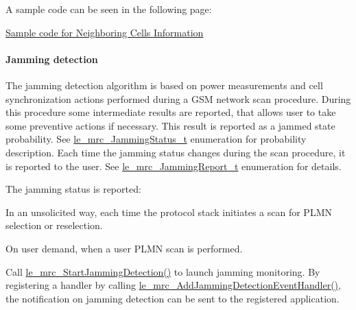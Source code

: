 A sample code can be seen in the following page\+:
\begin{DoxyItemize}
\item \hyperlink{c_mrcNeighborCells}{Sample code for Neighboring Cells Information}
\end{DoxyItemize}\hypertarget{c_mrc_le_mrc_jamming}{}\paragraph{Jamming detection}\label{c_mrc_le_mrc_jamming}
The jamming detection algorithm is based on power measurements and cell synchronization actions performed during a G\+SM network scan procedure. During this procedure some intermediate results are reported, that allows user to take some preventive actions if necessary. This result is reported as a jammed state probability. See \hyperlink{le__mrc__interface_8h_ac55bd8f71baee81d0021cc48f8ca0e09}{le\+\_\+mrc\+\_\+\+Jamming\+Status\+\_\+t} enumeration for probability description. Each time the jamming status changes during the scan procedure, it is reported to the user. See \hyperlink{le__mrc__interface_8h_a06440780b5eeaeed66051e5c81ff20df}{le\+\_\+mrc\+\_\+\+Jamming\+Report\+\_\+t} enumeration for details.

The jamming status is reported\+:
\begin{DoxyItemize}
\item In an unsolicited way, each time the protocol stack initiates a scan for P\+L\+MN selection or reselection.
\item On user demand, when a user P\+L\+MN scan is performed.
\end{DoxyItemize}

Call \hyperlink{le__mrc__interface_8h_ab1876d046a3aff763a2159da29f0481c}{le\+\_\+mrc\+\_\+\+Start\+Jamming\+Detection()} to launch jamming monitoring. By registering a handler by calling \hyperlink{le__mrc__interface_8h_a191db5e4637e5307db7ee10104128867}{le\+\_\+mrc\+\_\+\+Add\+Jamming\+Detection\+Event\+Handler()}, the notification on jamming detection can be sent to the registered application.

